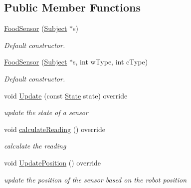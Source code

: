 \subsection*{Public Member Functions}
\begin{DoxyCompactItemize}
\item 
\hyperlink{classFoodSensor_ae98d371f10c115fcdd2b17e0d373f8da}{Food\+Sensor} (\hyperlink{classSubject}{Subject} $\ast$s)\hypertarget{classFoodSensor_ae98d371f10c115fcdd2b17e0d373f8da}{}\label{classFoodSensor_ae98d371f10c115fcdd2b17e0d373f8da}

\begin{DoxyCompactList}\small\item\em Default constructor. \end{DoxyCompactList}\item 
\hyperlink{classFoodSensor_a3bb239a57b66c82dc943d94f883eb3f5}{Food\+Sensor} (\hyperlink{classSubject}{Subject} $\ast$s, int w\+Type, int c\+Type)\hypertarget{classFoodSensor_a3bb239a57b66c82dc943d94f883eb3f5}{}\label{classFoodSensor_a3bb239a57b66c82dc943d94f883eb3f5}

\begin{DoxyCompactList}\small\item\em Default constructor. \end{DoxyCompactList}\item 
void \hyperlink{classFoodSensor_a1ecad3a783f42a7957fef9748016b1f2}{Update} (const \hyperlink{structState}{State} state) override
\begin{DoxyCompactList}\small\item\em update the state of a sensor \end{DoxyCompactList}\item 
void \hyperlink{classFoodSensor_a685a51282601f5c42c94192d48bf6bb9}{calculate\+Reading} () override\hypertarget{classFoodSensor_a685a51282601f5c42c94192d48bf6bb9}{}\label{classFoodSensor_a685a51282601f5c42c94192d48bf6bb9}

\begin{DoxyCompactList}\small\item\em calculate the reading \end{DoxyCompactList}\item 
void \hyperlink{classFoodSensor_a5ce7a8ce2247878ab1251215193492d1}{Update\+Position} () override\hypertarget{classFoodSensor_a5ce7a8ce2247878ab1251215193492d1}{}\label{classFoodSensor_a5ce7a8ce2247878ab1251215193492d1}

\begin{DoxyCompactList}\small\item\em update the position of the sensor based on the robot position \end{DoxyCompactList}\end{DoxyCompactItemize}
